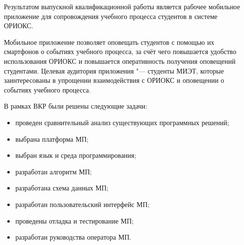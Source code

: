 \Conclusion %

Результатом выпускной квалификационной работы является рабочее мобильное приложение для сопровождения учебного процесса студентов в системе ОРИОКС.

Мобильное приложение позволяет оповещать студентов с помощью их смартфонов о событиях учебного процесса, за счёт чего повышается удобство использования ОРИОКС и повышается оперативность получения оповещений студентами.
Целевая аудитория приложения "--- студенты МИЭТ, которые заинтересованы в упрощении взаимодействия с ОРИОКС и оповещении о событиях учебного процесса.

В рамках ВКР были решены следующие задачи:
\begin{itemize}
  \item проведен сравнительный анализ существующих программных решений;
  \item выбрана платформа МП;
  \item выбран язык и среда программирования;
  \item разработан алгоритм МП;
  \item разработана схема данных МП;
  \item разработан пользовательский интерфейс МП;
  \item проведены отладка и тестирование МП;
  \item разработан руководства оператора МП.
\end{itemize}
